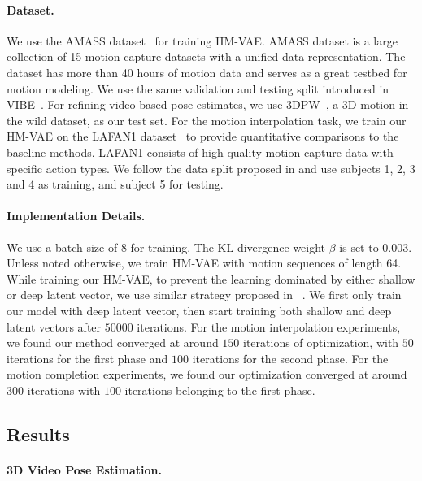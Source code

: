 \paragraph{Dataset.}
We use the AMASS dataset~\cite{mahmood2019amass} for training HM-VAE. AMASS dataset is a large collection of 15 motion capture datasets with a unified data representation. The dataset has more than 40 hours of motion data and serves as a great testbed for motion modeling.  
We use the same validation and testing split introduced in VIBE~\cite{kocabas2020vibe}. 
For refining video based pose estimates, we use 3DPW~\cite{von2018recovering}, a 3D motion in the wild dataset, as our test set.  
For the motion interpolation task, we train our HM-VAE on the LAFAN1 dataset~\cite{harvey2020robust} to provide quantitative comparisons to the baseline methods. LAFAN1 consists of high-quality motion capture data with specific action types. We follow the data split proposed in \cite{harvey2020robust} and use subjects 1, 2, 3 and 4 as training, and subject 5 for testing.

\paragraph{Implementation Details.}
We use a batch size of $8$ for training. The KL divergence weight $\beta$ is set to $0.003$. Unless noted otherwise, we train HM-VAE with motion sequences of length 64. While training our HM-VAE, to prevent the learning dominated by either shallow or deep latent vector, we use similar strategy proposed in ~\cite{li2020progressive}. We first only train our model with deep latent vector, then start training both shallow and deep latent vectors after $50000$ iterations. 
For the motion interpolation experiments, we found our method converged at around $150$ iterations of optimization, with $50$ iterations for the first phase and $100$ iterations for the second phase.
For the motion completion experiments, we found our optimization converged at around $300$ iterations with $100$ iterations belonging to the first phase.





\subsection{Results}
\paragraph{3D Video Pose Estimation.}

